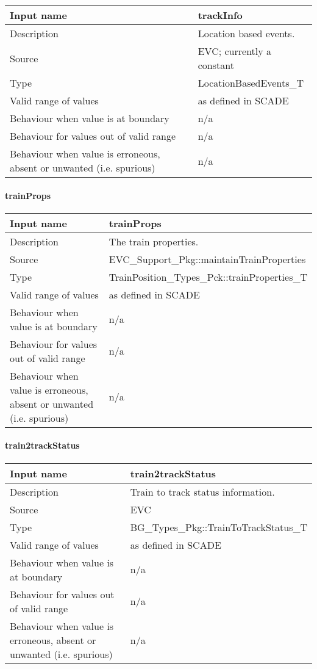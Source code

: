 \begin{longtable}{p{}p{}}
\toprule
Input name				& trackInfo \\
\midrule
Description				& Location based events. \\
\midrule
Source					& EVC; currently a constant \\ 
\midrule
Type					& LocationBasedEvents\_T \\
\midrule
Valid range of values	& as defined in SCADE \\
\midrule
Behaviour when value is at boundary	& n/a \\
\midrule
Behaviour for values out of valid range	& n/a \\
\midrule
Behaviour when value is erroneous, absent or unwanted (i.e. spurious) & n/a \\
\bottomrule
\end{longtable}

\paragraph{trainProps}

\begin{longtable}{p{}p{}}
\toprule
Input name				& trainProps \\
\midrule
Description				& The train properties. \\
\midrule
Source					& EVC\_Support\_Pkg::maintainTrainProperties \\ 
\midrule
Type					& TrainPosition\_Types\_Pck::trainProperties\_T \\
\midrule
Valid range of values	& as defined in SCADE \\
\midrule
Behaviour when value is at boundary	& n/a \\
\midrule
Behaviour for values out of valid range	& n/a \\
\midrule
Behaviour when value is erroneous, absent or unwanted (i.e. spurious) & n/a \\
\bottomrule
\end{longtable}

\paragraph{train2trackStatus}

\begin{longtable}{p{}p{}}
\toprule
Input name				& train2trackStatus \\
\midrule
Description				& Train to track status information. \\
\midrule
Source					& EVC \\ 
\midrule
Type					& BG\_Types\_Pkg::TrainToTrackStatus\_T \\
\midrule
Valid range of values	& as defined in SCADE \\
\midrule
Behaviour when value is at boundary	& n/a \\
\midrule
Behaviour for values out of valid range	& n/a \\
\midrule
Behaviour when value is erroneous, absent or unwanted (i.e. spurious) & n/a \\
\bottomrule
\end{longtable}

